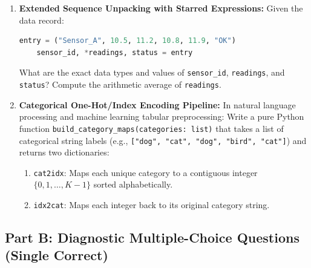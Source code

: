 \begin{enumerate}
    \item \textbf{Extended Sequence Unpacking with Starred Expressions:}
    Given the data record:
    \begin{lstlisting}[language=Python]
    entry = ("Sensor_A", 10.5, 11.2, 10.8, 11.9, "OK")
    sensor_id, *readings, status = entry
    \end{lstlisting}
    What are the exact data types and values of \texttt{sensor\_id}, \texttt{readings}, and \texttt{status}? Compute the arithmetic average of \texttt{readings}.

    \item \textbf{Categorical One-Hot/Index Encoding Pipeline:}
    In natural language processing and machine learning tabular preprocessing:
    Write a pure Python function \texttt{build\_category\_maps(categories: list)} that takes a list of categorical string labels (e.g., \texttt{["dog", "cat", "dog", "bird", "cat"]}) and returns two dictionaries:
    \begin{enumerate}
        \item \texttt{cat2idx}: Maps each unique category to a contiguous integer $\{0, 1, \dots, K-1\}$ sorted alphabetically.
        \item \texttt{idx2cat}: Maps each integer back to its original category string.
    \end{enumerate}
\end{enumerate}

\subsection*{Part B: Diagnostic Multiple-Choice Questions (Single Correct)}

